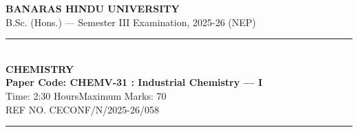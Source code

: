 \documentclass[11pt,a4paper]{article}
\begin{document}
\begin{center}
  {\large\bfseries BANARAS HINDU UNIVERSITY}\\[2pt]
  {\normalsize B.Sc. (Hons.) --- Semester III Examination, 2025-26 (NEP)}\\[6pt]
  \rule{0.8\linewidth}{0.5pt}\\[6pt]
  {\large\bfseries CHEMISTRY}\\[4pt]
  {\large\bfseries Paper Code: CHEMV-31 : Industrial Chemistry --- I}\\[4pt]
  {\normalsize Time: 2:30 Hours\hfill Maximum Marks: 70}\\[2pt]
  {\small REF NO. CECONF/N/2025-26/058}
\end{center}

\rule{\linewidth}{0.4pt}

\smallskip
\end{document}
